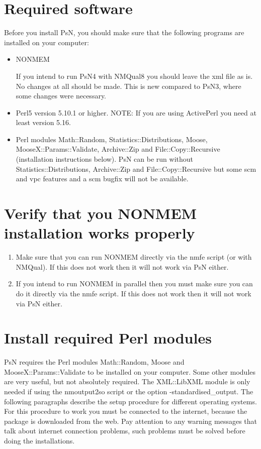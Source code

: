 


\maketitle

\section{Required software}
Before you install PsN, you should make sure that the following programs are installed on your computer:
\begin{itemize}
\item NONMEM 

If you intend to run PsN4 with NMQual8 you should leave the xml file as is. No changes at all should be made.
This is new compared to PsN3, where some changes were necessary.
	\item Perl5 version 5.10.1 or higher. NOTE: If you are using ActivePerl you need at least version 5.16.
	\item Perl modules Math::Random, Statistics::Distributions, Moose, MooseX::Params::Validate, Archive::Zip and File::Copy::Recursive (installation instructions below). PsN can be run without Statistics::Distributions, Archive::Zip and File::Copy::Recursive but some scm and vpc features and a scm bugfix will not be available.
\end{itemize}

\section{Verify that you NONMEM installation works properly}
\begin{enumerate}
\item Make sure that you can run NONMEM directly via the nmfe script (or with NMQual). If this does not work then it will not work via PsN either.
\item If you intend to run NONMEM in parallel then you must make sure you can do it directly via the nmfe script. If this does not work then it will not work via PsN either.
\end{enumerate}

\section{Install required Perl modules}
PsN requires the Perl modules Math::Random, Moose and MooseX::Params::Validate to be installed on your computer. Some other modules are very useful, but not absolutely required. The XML::LibXML module is only needed if using the nmoutput2so script or the option -standardised\_output. The following paragraphs describe the setup procedure for different operating systems. For this procedure to work you must be connected to the internet, because the package is downloaded from the web. Pay attention to any warning messages that talk about internet connection problems, such problems must be solved before doing the installations.

